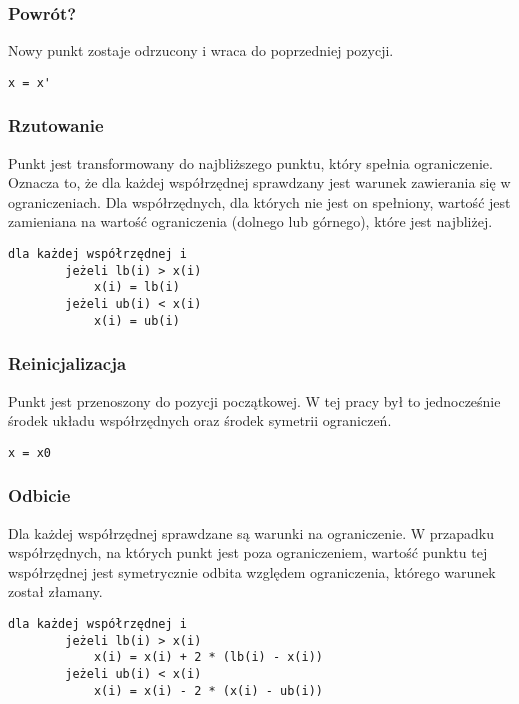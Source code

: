 \documentclass{mini}
\begin{document}
\subsubsection{Powrót?}
Nowy punkt zostaje odrzucony i wraca do poprzedniej pozycji.

\begin{Verbatim}[baselinestretch=1.1]
	x = x'
\end{Verbatim}


\subsubsection{Rzutowanie}
Punkt jest transformowany do najbliższego punktu, który spełnia ograniczenie. Oznacza to, że dla każdej współrzędnej sprawdzany jest warunek zawierania się w ograniczeniach. Dla współrzędnych, dla których nie jest on spełniony, wartość jest zamieniana na wartość ograniczenia (dolnego lub górnego), które jest najbliżej.

\begin{Verbatim}[baselinestretch=1.1]
	dla każdej współrzędnej i
		jeżeli lb(i) > x(i)
			x(i) = lb(i)
		jeżeli ub(i) < x(i)
			x(i) = ub(i)
\end{Verbatim}

\subsubsection{Reinicjalizacja}
Punkt jest przenoszony do pozycji początkowej. W tej pracy był to jednocześnie środek układu współrzędnych oraz środek symetrii ograniczeń.

\begin{Verbatim}[baselinestretch=1.1]
	x = x0
\end{Verbatim}


\subsubsection{Odbicie}
Dla każdej współrzędnej sprawdzane są warunki na ograniczenie. W przapadku współrzędnych, na których punkt jest poza ograniczeniem, wartość punktu tej współrzędnej jest symetrycznie odbita względem ograniczenia, którego warunek został złamany.

\begin{Verbatim}[baselinestretch=1.1]
	dla każdej współrzędnej i
		jeżeli lb(i) > x(i)
			x(i) = x(i) + 2 * (lb(i) - x(i))
		jeżeli ub(i) < x(i)
			x(i) = x(i) - 2 * (x(i) - ub(i))
\end{Verbatim}
\end{document}
